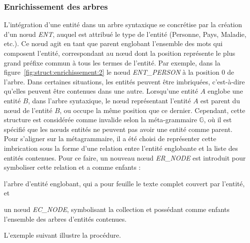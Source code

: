 \subsubsection{Enrichissement des arbres}
L'intégration d'une entité dans un arbre syntaxique se concrétise par la création d'un nœud \emph{ENT}, auquel est attribué le type de l'entité (Personne, Pays, Maladie, etc.).
Ce nœud agit en tant que parent englobant l'ensemble des mots qui composent l'entité, correspondant au nœud dont la position représente le plus grand préfixe commun à tous les termes de l'entité.
Par exemple, dans la figure~\ref{fig:struct:enrichissement:2} le nœud \emph{ENT\_PERSON} à la position $0$ de l'arbre. 
Dans certaines situations, les entités peuvent être imbriquées, c'est-à-dire qu'elles peuvent être contenues dans une autre.
Lorsqu'une entité $A$ englobe une entité $B$, dans l'arbre syntaxique, le nœud représentant l'entité $A$ est parent du nœud de l'entité $B$, ou occupe la même position que ce dernier.
Cependant, cette structure est considérée comme invalide selon la méta-grammaire $\mathbb{G}$, où il est spécifié que les nœuds entités ne peuvent pas avoir une entité comme parent.
Pour s'aligner sur la métagrammaire, il a été choisi de représenter cette imbrication sous la forme d'une relation entre l'entité englobante et la liste des entités contenues.
Pour ce faire, un nouveau nœud \emph{ER\_NODE} est introduit pour symboliser cette relation et a comme enfants :
\begin{enumerate*}[label=(\roman*)]
    \item l'arbre d'entité englobant, qui a pour feuille le texte complet couvert par l'entité, et
    \item un nœud \emph{EC\_NODE}, symbolisant la collection et possédant comme enfants l'ensemble des arbres d'entités contenues.
\end{enumerate*}
L'exemple suivant illustre la procédure.

